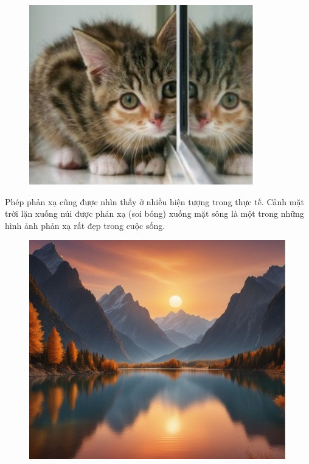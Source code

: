 \begin{multicols}{2}
	\begin{figure}[H]
		\vspace*{-5pt}
		\centering
		\captionsetup{labelformat= empty, justification=centering}
		\includegraphics[width= 1\linewidth]{Picture2}
		\vspace*{-10pt}
	\end{figure}
	Phép phản xạ cũng được nhìn thấy ở nhiều hiện tượng trong thực tế. Cảnh mặt trời lặn xuống núi được phản xạ (soi bóng) xuống mặt sông là một trong những hình ảnh phản xạ rất đẹp trong cuộc sống.
	\begin{figure}[H]
		\vspace*{-5pt}
		\centering
		\captionsetup{labelformat= empty, justification=centering}
		\includegraphics[width= 1\linewidth]{Picture3}

\end{figure}
\end{multicols}

